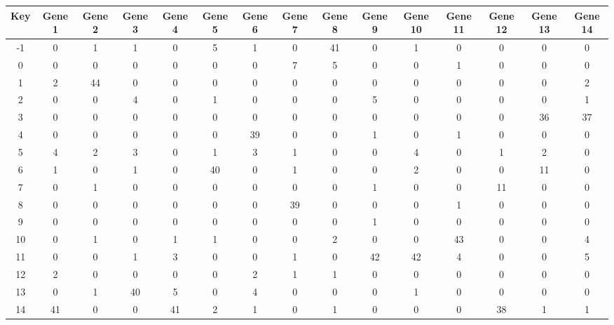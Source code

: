 \begin{tabular}{|c|c|c|c|c|c|c|c|c|c|c|c|c|c|c|}
\hline
Key & Gene 1 & Gene 2 & Gene 3 & Gene 4 & Gene 5 & Gene 6 & Gene 7 & Gene 8 & Gene 9 & Gene 10 & Gene 11 & Gene 12 & Gene 13 & Gene 14 \\
\hline
-1 & 0 & 1 & 1 & 0 & 5 & 1 & 0 & 41 & 0 & 1 & 0 & 0 & 0 & 0 \\
0 & 0 & 0 & 0 & 0 & 0 & 0 & 7 & 5 & 0 & 0 & 1 & 0 & 0 & 0 \\
1 & 2 & 44 & 0 & 0 & 0 & 0 & 0 & 0 & 0 & 0 & 0 & 0 & 0 & 2 \\
2 & 0 & 0 & 4 & 0 & 1 & 0 & 0 & 0 & 5 & 0 & 0 & 0 & 0 & 1 \\
3 & 0 & 0 & 0 & 0 & 0 & 0 & 0 & 0 & 0 & 0 & 0 & 0 & 36 & 37 \\
4 & 0 & 0 & 0 & 0 & 0 & 39 & 0 & 0 & 1 & 0 & 1 & 0 & 0 & 0 \\
5 & 4 & 2 & 3 & 0 & 1 & 3 & 1 & 0 & 0 & 4 & 0 & 1 & 2 & 0 \\
6 & 1 & 0 & 1 & 0 & 40 & 0 & 1 & 0 & 0 & 2 & 0 & 0 & 11 & 0 \\
7 & 0 & 1 & 0 & 0 & 0 & 0 & 0 & 0 & 1 & 0 & 0 & 11 & 0 & 0 \\
8 & 0 & 0 & 0 & 0 & 0 & 0 & 39 & 0 & 0 & 0 & 1 & 0 & 0 & 0 \\
9 & 0 & 0 & 0 & 0 & 0 & 0 & 0 & 0 & 1 & 0 & 0 & 0 & 0 & 0 \\
10 & 0 & 1 & 0 & 1 & 1 & 0 & 0 & 2 & 0 & 0 & 43 & 0 & 0 & 4 \\
11 & 0 & 0 & 1 & 3 & 0 & 0 & 1 & 0 & 42 & 42 & 4 & 0 & 0 & 5 \\
12 & 2 & 0 & 0 & 0 & 0 & 2 & 1 & 1 & 0 & 0 & 0 & 0 & 0 & 0 \\
13 & 0 & 1 & 40 & 5 & 0 & 4 & 0 & 0 & 0 & 1 & 0 & 0 & 0 & 0 \\
14 & 41 & 0 & 0 & 41 & 2 & 1 & 0 & 1 & 0 & 0 & 0 & 38 & 1 & 1 \\
\hline
\end{tabular}